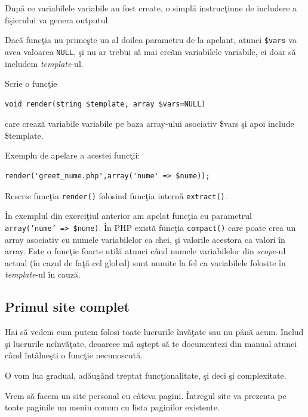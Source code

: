 După ce variabilele variabile
au fost create, o simplă instrucţiune de includere a fişierului va genera outputul.

Dacă funcţia nu primeşte un al doilea parametru de la apelant, atunci \texttt{\$vars}
va avea valoarea \texttt{NULL}, şi nu ar trebui să mai creăm variabilele variabile,
ci doar să includem \textit{template}-ul.

\begin{Exercise}[title={O funcţie render()}]
\ExePart
Scrie o funcţie
\begin{verbatim}
void render(string $template, array $vars=NULL)
\end{verbatim}
care crează variabile variabile pe baza array-ului asociativ \$vars
şi apoi include \$template.

Exemplu de apelare a acestei funcţii:
\begin{lstlisting}
render('greet_nume.php',array('nume' => $nume));
\end{lstlisting}

\ExePart

Rescrie funcţia \texttt{render()} folosind funcţia internă
\texttt{extract()}.
\end{Exercise}
În exemplul din exerciţiul anterior am apelat funcţia cu parametrul
\texttt{array('nume' => \$nume)}. În PHP există funcţia \texttt{compact()}
care poate crea un array asociativ cu numele variabilelor ca chei, şi
valorile acestora ca valori în array. Este o funcţie foarte utilă
atunci când numele variabilelor din \textit{scope}-ul actual (în cazul de
faţă cel global) sunt numite la fel ca variabilele folosite în
\textit{template}-ul în cauză.


\subsection{Primul site complet}
Hai să vedem cum putem folosi toate lucrurile învăţate sau nu până acum. Includ
şi lucrurile neînvăţate, deoarece mă aştept să te documentezi din manual
atunci când întâlneşti o funcţie necunoscută.

O vom lua gradual, adăugând treptat funcţionalitate, şi deci şi complexitate.

Vrem să facem un site personal cu câteva pagini. Întregul site va prezenta
pe toate paginile un meniu comun cu lista paginilor existente. 

